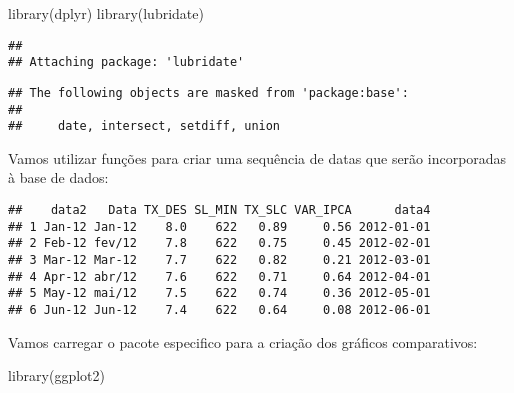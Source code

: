 \documentclass[
]{article}
\newenvironment{Shaded}{\begin{snugshade}}{\end{snugshade}}
\newcommand{\FunctionTok}[1]{\textcolor[rgb]{0.00,0.00,0.00}{#1}}
\newcommand{\NormalTok}[1]{#1}
\newcommand{\OtherTok}[1]{\textcolor[rgb]{0.56,0.35,0.01}{#1}}
\newcommand{\SpecialCharTok}[1]{\textcolor[rgb]{0.00,0.00,0.00}{#1}}
\newcommand{\StringTok}[1]{\textcolor[rgb]{0.31,0.60,0.02}{#1}}
\begin{document}
\begin{Shaded}
\begin{Highlighting}[]
\FunctionTok{library}\NormalTok{(dplyr)}
\FunctionTok{library}\NormalTok{(lubridate)}
\end{Highlighting}
\end{Shaded}

\begin{verbatim}
## 
## Attaching package: 'lubridate'
\end{verbatim}

\begin{verbatim}
## The following objects are masked from 'package:base':
## 
##     date, intersect, setdiff, union
\end{verbatim}

Vamos utilizar funções para criar uma sequência de datas que serão
incorporadas à base de dados:

\begin{Shaded}
\end{Shaded}

\begin{verbatim}
##    data2   Data TX_DES SL_MIN TX_SLC VAR_IPCA      data4
## 1 Jan-12 Jan-12    8.0    622   0.89     0.56 2012-01-01
## 2 Feb-12 fev/12    7.8    622   0.75     0.45 2012-02-01
## 3 Mar-12 Mar-12    7.7    622   0.82     0.21 2012-03-01
## 4 Apr-12 abr/12    7.6    622   0.71     0.64 2012-04-01
## 5 May-12 mai/12    7.5    622   0.74     0.36 2012-05-01
## 6 Jun-12 Jun-12    7.4    622   0.64     0.08 2012-06-01
\end{verbatim}

Vamos carregar o pacote especifico para a criação dos gráficos
comparativos:

\begin{Shaded}
\begin{Highlighting}[]
\FunctionTok{library}\NormalTok{(ggplot2)}
\end{Highlighting}
\end{Shaded}
\end{document}
